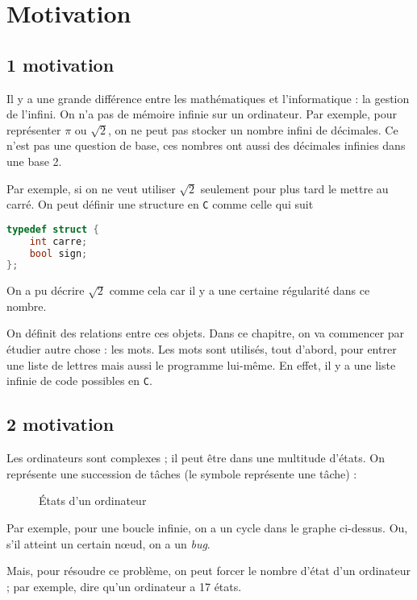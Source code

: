 \section{Motivation}

\subsection{1 motivation}

Il y a une grande différence entre les mathématiques et l'informatique : la gestion de l'infini.
On n'a pas de mémoire infinie sur un ordinateur.
Par exemple, pour représenter $\pi$\/ ou $\sqrt{2}$, on ne peut pas stocker un nombre infini de décimales. Ce n'est pas une question de base, ces nombres ont aussi des décimales infinies dans une base 2.

Par exemple, si on ne veut utiliser $\sqrt{2}$\/ seulement pour plus tard le mettre au carré. On peut définir une structure en {\tt C}\/ comme celle qui suit
\begin{lstlisting}[language=c, caption=$\sqrt{2}$\/ sous forme de structure]
typedef struct {
	int carre;
	bool sign;
};
\end{lstlisting}
On a pu décrire $\sqrt{2}$\/ comme cela car il y a une certaine régularité dans ce nombre.

On définit des relations entre ces objets. Dans ce chapitre, on va commencer par étudier autre chose : les mots.
Les mots sont utilisés, tout d'abord, pour entrer une liste de lettres mais aussi le programme lui-même. En effet, il y a une liste infinie de code possibles en {\tt C}.

\subsection{2 motivation}

Les ordinateurs sont complexes ; il peut être dans une multitude d'états.
On représente une succession de tâches (le symbole {} représente une tâche) : 
\begin{figure}[H]
	\centering
	\caption{États d'un ordinateur}
\end{figure}
\noindent Par exemple, pour une boucle infinie, on a un cycle dans le graphe ci-dessus. Ou, s'il atteint un certain nœud, on a un {\it bug}.

Mais, pour résoudre ce problème, on peut forcer le nombre d'état d'un ordinateur ; par exemple, dire qu'un ordinateur a 17 états.

